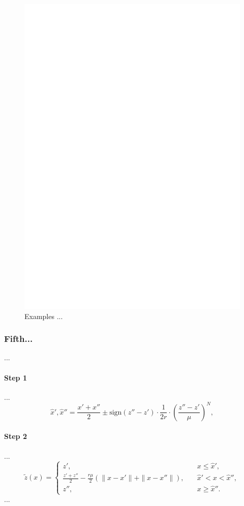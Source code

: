 \documentclass[runningheads]{llncs}
\begin{document}
\begin{figure}
\includegraphics[width=\textwidth]{fig1.pdf}
\caption{Examples ... } \label{fig5}
\end{figure}

\subsubsection{Fifth...} ...
\paragraph{Step 1} ...
\begin{equation}
\hat{x}',\hat{x}''=\frac {x'+x''}{2}\pm \text{sign}(z''-z')\cdot \frac {1}{2r} \cdot {\left(\frac {z''-z'}{\mu}\right)}^N,
\end{equation}
\paragraph{Step 2} ...
\begin{equation}
\tilde{z}(x)=
  \begin{cases}
    z', & {\quad x \leq \hat{x}',}\\
    \frac {z'+z''}{2}- \frac {r \mu}{2} (\| x - x' \| + \| x - x'' \|), & {\quad \hat{x}' < x < \hat{x}'',}\\
    z'',  & {\quad x \geq \hat{x}''.}
  \end{cases}
\end{equation}
...
\end{document}
